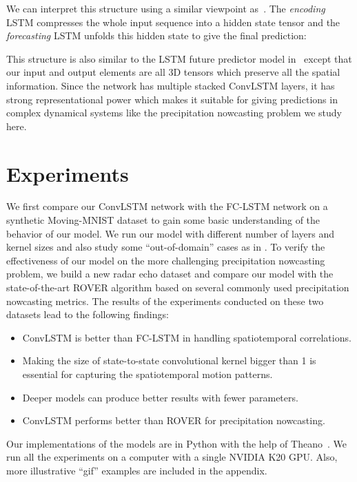 \documentclass{article} \usepackage{amsmath}
\begin{document}
We can interpret this structure using a similar viewpoint as~\cite{sutskever2014sequence}. The \emph{encoding} LSTM compresses the whole input sequence into a hidden state tensor and the \emph{forecasting} LSTM unfolds this hidden state to give the final prediction:

This structure is also similar to the LSTM future predictor model in~\cite{srivastava2015unsupervised} except that our input and output elements are all 3D tensors which preserve all the spatial information. Since the network has multiple stacked ConvLSTM layers, it has strong representational power which makes it suitable for giving predictions in complex dynamical systems like the precipitation nowcasting problem we study here.

\section{Experiments}
We first compare our ConvLSTM network with the FC-LSTM network on a synthetic Moving-MNIST dataset to gain some basic understanding of the behavior of our model. We run our model with different number of layers and kernel sizes and also study some ``out-of-domain'' cases as in \cite{srivastava2015unsupervised}.
To verify the effectiveness of our model on the more challenging precipitation nowcasting problem, we build a new radar echo dataset and compare our model with the state-of-the-art ROVER algorithm based on several commonly used precipitation nowcasting metrics.  The results of the experiments conducted on these two datasets lead to the following findings:
\begin{itemize}
\vspace{-0.5em}
\item ConvLSTM is better than FC-LSTM in handling spatiotemporal correlations.
\item Making the size of state-to-state convolutional kernel bigger than 1 is essential for capturing the spatiotemporal motion patterns.
\item Deeper models can produce better results with fewer parameters.
\item ConvLSTM performs better than ROVER for precipitation nowcasting.
\vspace{-0.5em}
\end{itemize}
Our implementations of the models are in Python with the help of Theano~\cite{bergstra2010theano,bastien2012theano}.  We run all the experiments on a computer with a single NVIDIA K20 GPU. Also, more illustrative ``gif'' examples are included in the appendix. 
\end{document}
